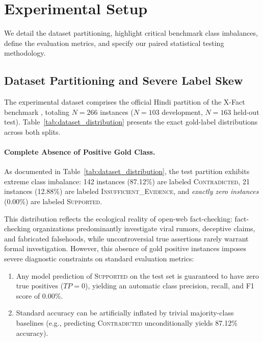 \section{Experimental Setup}
\label{sec:exp_setup}

We detail the dataset partitioning, highlight critical benchmark class imbalances, define the evaluation metrics, and specify our paired statistical testing methodology.

\subsection{Dataset Partitioning and Severe Label Skew}
The experimental dataset comprises the official Hindi partition of the X-Fact benchmark \citep{gupta-srikumar-2021-xfact}, totaling $N=266$ instances ($N=103$ development, $N=163$ held-out test). Table~\ref{tab:dataset_distribution} presents the exact gold-label distributions across both splits.



\paragraph{Complete Absence of Positive Gold Class.}
As documented in Table~\ref{tab:dataset_distribution}, the test partition exhibits extreme class imbalance: 142 instances (87.12\%) are labeled \textsc{Contradicted}, 21 instances (12.88\%) are labeled \textsc{Insufficient\_Evidence}, and \emph{exactly zero instances} (0.00\%) are labeled \textsc{Supported}. 

This distribution reflects the ecological reality of open-web fact-checking: fact-checking organizations predominantly investigate viral rumors, deceptive claims, and fabricated falsehoods, while uncontroversial true assertions rarely warrant formal investigation. However, this absence of gold positive instances imposes severe diagnostic constraints on standard evaluation metrics:
\begin{enumerate}
    \item Any model prediction of \textsc{Supported} on the test set is guaranteed to have zero true positives ($TP = 0$), yielding an automatic class precision, recall, and F1 score of 0.00\%.
    \item Standard accuracy can be artificially inflated by trivial majority-class baselines (e.g., predicting \textsc{Contradicted} unconditionally yields 87.12\% accuracy).
\end{enumerate}

